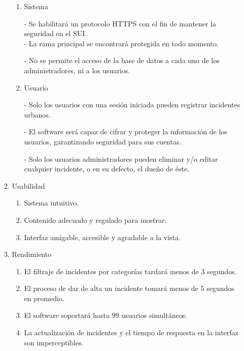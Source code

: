 \documentclass{article}
\begin{document}
\begin{enumerate}
\begin{enumerate}
\begin{enumerate}
                \item Sistema
                
                - Se habilitará un protocolo HTTPS con el fin de mantener la seguridad en el SUI. \\

                - La rama principal se encontrará protegida en todo momento.

                - No se permite el acceso de la base de datos a cada uno de los administradores, ni a los usuarios. \\

                \item Usuario

                - Solo los usuarios con una sesión iniciada pueden registrar incidentes urbanos.
                
                - El software será capaz de cifrar y proteger la información de los usuarios, garantizando seguridad para sus cuentas. 

                - Solo los usuarios administradores pueden eliminar y/o editar cualquier incidente, o en su defecto, el dueño de éste. \\
            
                \end{enumerate}

            \item Usabilidad
            
                \begin{enumerate}

                    \item Sistema intuitivo.
                    \item Contenido adecuado y regulado para mostrar.
                    \item Interfaz amigable, accesible y agradable a la vista. \\
                
                \end{enumerate}

            \item Rendimiento

                \begin{enumerate}
                
                \item El filtraje de incidentes por categorías tardará menos de 3 segundos.
                \item El proceso de dar de alta un incidente tomará menos de 5 segundos en promedio.
                \item El software soportará hasta 99 usuarios simultáneos.
                \item La actualización de incidentes y el tiempo de respuesta en la interfaz son imperceptibles. 


\end{enumerate}
\end{enumerate}
\end{enumerate}
\end{document}
